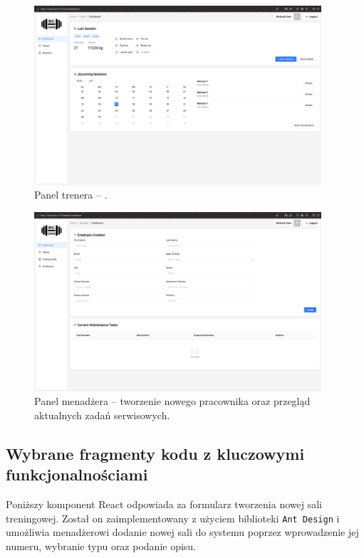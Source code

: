 \documentclass[../../spr.tex]{subfiles}
\begin{document}
\begin{figure}[H]
  \centering
  \includegraphics[width=0.95\textwidth]{trener.png}
  \caption{Panel trenera – .}
\end{figure}

\begin{figure}[H]
  \centering
  \includegraphics[width=0.95\textwidth]{menadzer.png}
  \caption{Panel menadżera – tworzenie nowego pracownika oraz przegląd aktualnych zadań serwisowych.}
\end{figure}

\subsection{Wybrane fragmenty kodu z kluczowymi funkcjonalnościami}

Poniższy komponent React odpowiada za formularz tworzenia nowej sali treningowej.
Został on zaimplementowany z użyciem biblioteki \texttt{Ant Design} i
umożliwia menadżerowi dodanie nowej sali do systemu poprzez wprowadzenie jej numeru,
wybranie typu oraz podanie opisu.

\inputminted[breaklines, fontsize=\footnotesize, breakanywhere]
{typescript}{./sections/implementacja/HallCreationCard.tsx}
\end{document}
